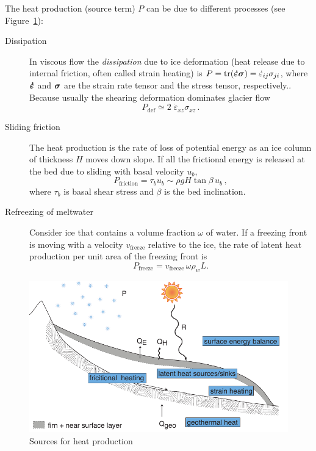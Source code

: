 \documentclass[parskip=half]{scrartcl}
\newcommand{\epsdot}{\dot{\varepsilon}}
\newcommand{\bsigma}{\mbox{\boldmath$\sigma$\unboldmath}}
\newcommand{\bepsdot}{\mbox{\boldmath$\epsdot$\unboldmath}}
\begin{document}
The heat production (source term) $P$ can be due to different
processes (see Figure~\ref{fig:energy-sources}):\\[-1em]
%
\begin{description}
\item[Dissipation] In viscous flow the \emph{dissipation}
 due to ice deformation (heat release due to
internal friction, often called strain heating) is
$P=\mathrm{tr}({\bepsdot\bsigma})= \epsdot_{ij}\sigma_{ji}$, where
$\bepsdot$ and $\bsigma$ are the strain rate tensor and the stress
tensor, respectively..  Because usually the shearing deformation
dominates glacier flow
 \begin{equation*} P_{\text{def}} \simeq 2
\;\epsdot_{xz}\sigma_{xz}\,.
 \end{equation*}
\item[Sliding friction] The heat production is the rate of loss of
potential energy as an ice column of thickness $H$ moves down slope.
If all the frictional energy is released at the bed due to sliding
with basal velocity $u_b$,
 \begin{equation*} P_{\text{friction}} = \tau_bu_b \sim \rho g H
\tan\beta \, u_b \,,
 \end{equation*} where $\tau_b$ is basal shear stress and $\beta$ is
the bed inclination.
\item[Refreezing of meltwater] Consider ice that contains a volume
fraction $\omega$ of water. If a freezing front is moving with a
velocity $v_\text{freeze}$ relative to the ice, the rate of latent
heat production per unit area of the freezing front is
 \begin{equation*} P_{\text{freeze}} = v_\text{freeze} \,\omega \rho_w
L.
 \end{equation*}
\end{description}

  \begin{figure} \centering
    \includegraphics[width=12cm]{figures/glacier_thermodynamics}
    \caption{Sources for heat production}
    \label{fig:energy-sources}
  \end{figure}
\end{document}
